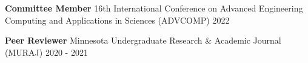 


\begin{cvhonors}    
\cvhonor
    {\textbf{Committee Member}} %
    {16th International Conference on Advanced Engineering Computing and Applications in Sciences (ADVCOMP)} %
    {} %
    {2022} %
\end{cvhonors}

\begin{cvhonors}

\cvhonor
    {\textbf{Peer Reviewer}} %
    {Minnesota Undergraduate Research \& Academic Journal (MURAJ)} %
    {} %
    {2020 - 2021} %
    
\end{cvhonors}

\begin{cvpubs}
\end{cvpubs}